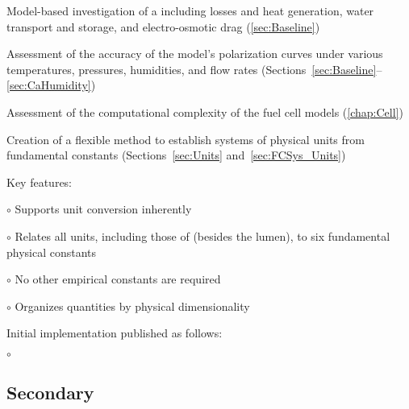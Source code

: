 \begin{itemize*}
  \item Model-based investigation of a  including losses and heat generation, water transport and storage, and electro-osmotic drag (\autoref{sec:Baseline})

  \item Assessment of the accuracy of the  model's polarization curves under various temperatures, pressures, humidities, and flow rates (Sections~\ref{sec:Baseline}--\ref{sec:CaHumidity})

  \item Assessment of the computational complexity of the fuel cell models (\autoref{chap:Cell})

  \item Creation of a flexible method to establish systems of physical units from fundamental constants (Sections~\ref{sec:Units} and~\ref{sec:FCSys_Units})
    \begin{itemize*}
      \item Key features:
        \begin{itemize*}
          \item[$\circ$] Supports unit conversion inherently
          \item[$\circ$] Relates all units, including those of  (besides the lumen), to six fundamental physical constants
          \item[$\circ$] No other empirical constants are required
          \item[$\circ$] Organizes quantities by physical dimensionality
        \end{itemize*}
    
      \item Initial implementation published as follows:\\      \vspace{-4ex}
      \begin{itemize*}%
        \item[$\circ$] 
      \end{itemize*}%
    \end{itemize*}
\end{itemize*}


\subsection{Secondary}

